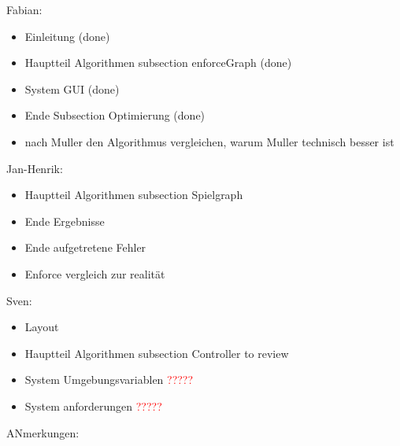 Fabian:
\begin{itemize}
	\item Einleitung (done)
	\item Hauptteil Algorithmen subsection enforceGraph (done)
	\item System GUI (done)
	\item Ende Subsection Optimierung (done)
	\item nach Muller den Algorithmus vergleichen, warum Muller technisch besser ist
\end{itemize}
Jan-Henrik:
\begin{itemize}
	\item Hauptteil Algorithmen subsection Spielgraph
	\item Ende Ergebnisse
	\item Ende aufgetretene Fehler
	\item Enforce vergleich zur realität
\end{itemize}
Sven:
\begin{itemize}
	\item Layout
	\item Hauptteil Algorithmen subsection Controller to review
	\item System Umgebungsvariablen \textcolor{red}{?????}
	\item System anforderungen \textcolor{red}{?????}
\end{itemize}



ANmerkungen:


